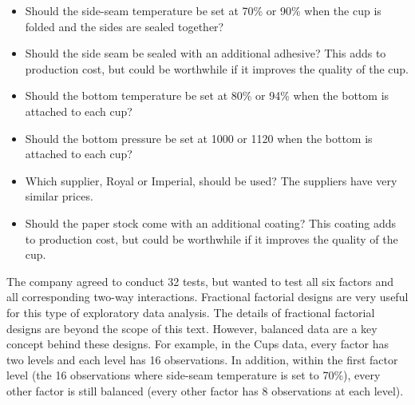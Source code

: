 \documentclass[
]{report}
\begin{document}
\begin{list}{E.}{ \setlength{\itemsep}{1.2em}}
  \begin{itemize}
    \item Should the side-seam temperature be set at 70\% or 90\% when the cup is folded and the sides are sealed together?
    \item Should the side seam be sealed with an additional adhesive? This adds to production cost, but could be worthwhile if it improves the quality of the cup.
    \item Should the bottom temperature be set at 80\% or 94\% when the bottom is attached to each cup?
    \item Should the bottom pressure be set at 1000 or 1120 when the bottom is attached to each cup?
    \item Which supplier, Royal or Imperial, should be used? The suppliers have very similar prices.
    \item Should the paper stock come with an additional coating? This coating adds to production cost, but could be worthwhile if it improves the quality of the cup.
    \end{itemize}

The company agreed to conduct 32 tests, but wanted to test all six factors and all corresponding two-way interactions. Fractional factorial designs are very useful for this type of exploratory data analysis. The details of fractional factorial designs are beyond the scope of this text. However, balanced data are a key concept behind these designs. For example, in the Cups data, every factor has two levels and each level has 16 observations. In addition, within the first factor level (the 16 observations where side-seam temperature is set to 70\%), every other factor is still balanced (every other factor has 8 observations at each level).


\end{list}
\end{document}

